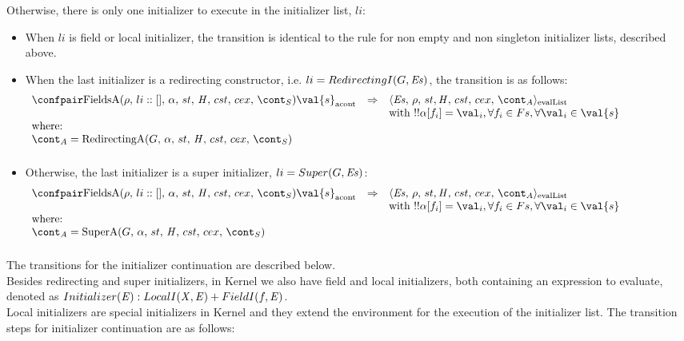 \documentclass{article}
\begin{document}
\noindent
Otherwise, there is only one initializer to execute in the initializer list, $li$: \\
\begin{itemize}

\item When $li$ is field or local initializer, the transition is identical to the rule for non empty and non singleton initializer lists, described above.\\
\item When the last initializer is a redirecting constructor, i.e. $li = RedirectingI(G, \mathit{E}\mathit{s})$, the transition is as follows:
\[
  \begin{array}{lcl@{\hspace{30mm}}}
	\acontconf{\FieldsA{\env}{li::[]}{\loc}{\scont}}{\val{s}}
	& \Rightarrow &
	\evallistconf{\exprs}{\env}{\strace}{\cstrace}{\cex}{\acont}\\	
	&&\textrm{with }\deref{\deref{\loc[f_i]}} = \val_{i}, \forall f_i \in Fs, \forall \val_i \in \val{s}\\
	\textrm{where:}\\
	\acont = \RedirectingA{G}{\loc}{\scont}\\[2mm]
  \end{array}
\]

\item Otherwise, the last initializer is a super initializer, $li = Super(G, \mathit{E}\mathit{s})$:
\[
  \begin{array}{lcl@{\hspace{30mm}}}
	\acontconf{\FieldsA{\env}{li::[]}{\loc}{\scont}}{\val{s}}
	& \Rightarrow &
	\evallistconf{\exprs}{\env}{\strace}{\cstrace}{\cex}{\acont}\\	
	&&\textrm{with }\deref{\deref{\loc[f_i]}} = \val_{i}, \forall f_i \in Fs, \forall \val_i \in \val{s}\\
	\textrm{where:}\\
	\acont = \SuperA{G}{\loc}{\scont}\\[2mm]
  \end{array}
\]
\end{itemize}
The transitions for the initializer continuation are described below.\\[2mm]
\noindent
Besides redirecting and super initializers, in Kernel we also have field and local initializers, both containing an expression to evaluate, denoted as $Initializer(\mathit{E}) : LocalI(\mathit{X}, \mathit{E}) + FieldI(f, \mathit{E})$.\\[2mm]
Local initializers are special initializers in Kernel and they extend the environment for the execution of the initializer list. The transition steps for initializer continuation are as follows:
\end{document}

